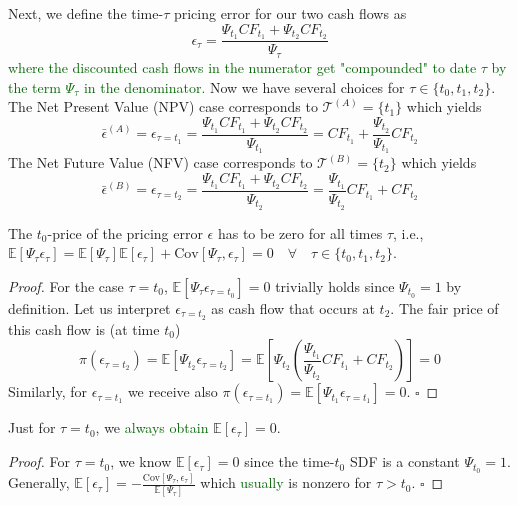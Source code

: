 Next, we define the time-$\tau$ pricing error for our two cash flows as
\[
\epsilon_{\tau} = \frac{\Psi_{t_1} {CF}_{t_1} + \Psi_{t_2} {CF}_{t_2}}{\Psi_{\tau}}
\]
\textcolor{darkgreen}{where the discounted cash flows in the numerator get "compounded" to date $\tau$ by the term $\Psi_{\tau}$ in the denominator.}
Now we have several choices for $\tau \in \{t_0,t_1,t_2\}$.
The Net Present Value (NPV) case corresponds to $\mathcal{T}^{(A)}=\{ t_1 \}$ which yields
\[
\bar{\epsilon}^{(A)}
=
\epsilon_{\tau = t_1}
= 
\frac{\Psi_{t_1} {CF}_{t_1} + \Psi_{t_2} {CF}_{t_2}}{\Psi_{t_1}}
=
{CF}_{t_1} + \frac{\Psi_{t_2}}{\Psi_{t_1}}  {CF}_{t_2}
\]
The Net Future Value (NFV) case corresponds to $\mathcal{T}^{(B)}=\{ t_2 \}$ which yields
\[
\bar{\epsilon}^{(B)}
=
\epsilon_{\tau = t_2}
=
\frac{\Psi_{t_1} {CF}_{t_1} + \Psi_{t_2} {CF}_{t_2}}{\Psi_{t_2}}
=
\frac{\Psi_{t_1}}{\Psi_{t_2}} {CF}_{t_1} + {CF}_{t_2}
\]

\begin{proposition}
	The $t_0$-price of the pricing error $\epsilon$ has to be zero for all times $\tau$, i.e., 
	$\mathbb{E} \left[ \Psi_{\tau} \epsilon_{\tau} \right] = \mathbb{E} \left[ \Psi_{\tau} \right] \mathbb{E} \left[ \epsilon_{\tau} \right] + \mathrm{Cov} \left[ \Psi_{\tau}, \epsilon_{\tau} \right] = 0 \quad \forall \quad \tau \in \{ t_0 ,t_1 ,t_2 \}$.
\end{proposition}

\begin{proof}
	For the case $\tau = t_0$, $\mathbb{E} \left[ \Psi_{\tau} \epsilon_{\tau = t_0} \right]=0$ trivially holds since $\Psi_{t_0}=1$ by definition.
	Let us interpret $\epsilon_{\tau = t_2}$ as cash flow that occurs at $t_2$.
	The fair price of this cash flow is (at time $t_0$)
	\[
	\pi(\epsilon_{\tau = t_2}) = 
	\mathbb{E} \left[ \Psi_{t_2} \epsilon_{\tau = t_2} \right] = 
	\mathbb{E} \left[ \Psi_{t_2} \left( \frac{\Psi_{t_1}}{\Psi_{t_2}} {CF}_{t_1} + {CF}_{t_2} \right) \right]
	= 0
	\]
	Similarly, for $\epsilon_{\tau = t_1}$ we receive also $\pi(\epsilon_{\tau = t_1}) = \mathbb{E} \left[ \Psi_{t_1} \epsilon_{\tau = t_1} \right] =  0$. 
	$\square$
\end{proof}

\begin{corollary}
	Just for $\tau=t_0$, we \textcolor{darkgreen}{always obtain} $\mathbb{E} \left[ \epsilon_{\tau} \right]=0$.
\end{corollary}

\begin{proof}
	For $\tau=t_0$, we know $\mathbb{E} \left[ \epsilon_{\tau} \right]=0$ since the time-$t_0$ SDF is a constant $\Psi_{t_0}=1$.
	Generally, $\mathbb{E} \left[ \epsilon_{\tau} \right] =  - \frac{\mathrm{Cov} \left[ \Psi_{\tau}, \epsilon_{\tau} \right]}{\mathbb{E} \left[ \Psi_{\tau} \right]}$ which \textcolor{darkgreen}{usually} is nonzero for $\tau > t_0$.
	$\square$
\end{proof}

